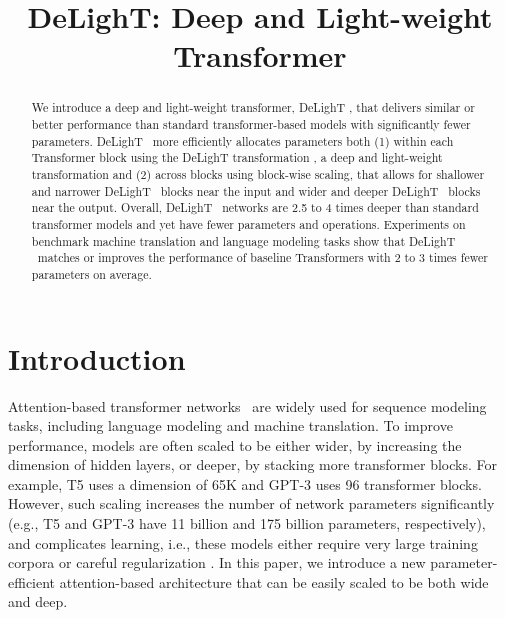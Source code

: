\title{DeLighT: Deep and Light-weight Transformer}



\maketitle

\begin{abstract}
We introduce a deep and light-weight transformer, DeLighT , that delivers similar or better performance than standard transformer-based models with significantly fewer parameters. DeLighT ~more efficiently allocates parameters both (1) within each Transformer block using the DeLighT transformation , a deep and light-weight transformation and (2) across blocks using block-wise scaling, that allows for shallower and narrower DeLighT ~blocks near the input and wider and deeper DeLighT ~blocks near the output. Overall, DeLighT ~networks are 2.5 to 4 times deeper than standard transformer models and yet have fewer parameters and operations. Experiments on benchmark machine translation and language modeling tasks show that DeLighT ~matches or improves the performance of baseline Transformers with 2 to 3 times fewer parameters on average. 
\end{abstract}

\section{Introduction}
Attention-based transformer networks~\citep{vaswani2017attention} are widely used for sequence modeling tasks, including language modeling and machine translation. To improve performance, models are often scaled to be either wider, by increasing the dimension of hidden layers, or deeper, by stacking more transformer blocks. For example, T5 \citep{raffel2019exploring} uses a dimension of 65K and GPT-3 \citep{brown2020language} uses 96 transformer blocks. However, such scaling increases the number of network parameters significantly (e.g., T5 and GPT-3 have 11 billion and 175 billion parameters, respectively), and complicates learning, i.e., these models either require very large training corpora \citep{raffel2019exploring,devlin2018bert,brown2020language} or careful regularization \citep{hinton2012improving,wan2013regularization,merity2018regularizing}. In this paper, we introduce a new parameter-efficient attention-based architecture that can be easily scaled to be both wide and deep. 

